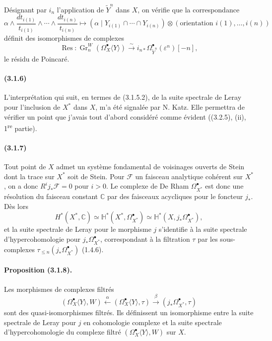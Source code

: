\documentclass[10pt]{article}
\newcommand{\C}{\mathbb C}
\newcommand{\Gr}{\operatorname{Gr}}
\newcommand{\fg}{\guillemotright}
\newcommand{\og}{\guillemotleft}
\newcommand{\iso}{\xrightarrow{\sim}}
\newcommand{\Res}{\operatorname{Res}}
\begin{document}
Désignant par $i_n$ l'application de $\widetilde Y^n$ dans $X$, on vérifie que la correspondance
\[
\alpha\wedge\frac{dt_{i(1)}}{t_{i(1)}}\wedge\cdots\wedge
\frac{dt_{i(n)}}{t_{i(n)}}
\longmapsto
(\alpha\mid Y_{i(1)}\cap\cdots\cap Y_{i(n)})\otimes
(\text{orientation }i(1),\ldots,i(n))
\]
définit des isomorphismes de complexes
\[
\tag{3.1.5.2}
\Res:\Gr_n^W(\Omega_X^\bullet\langle Y\rangle)\iso
i_{n*}\Omega_{\widetilde Y^n}^\bullet(\varepsilon^n)[-n],
\]
le \og résidu de Poincaré\fg.

\paragraph{(3.1.6)} L'interprétation qui suit, en termes de (3.1.5.2), de la suite spectrale de Leray pour l'inclusion de $X^*$ dans $X$, m'a été signalée par N. Katz. Elle permettra de vérifier un point que j'avais tout d'abord considéré comme évident ((3.2.5), (ii), 1\textsuperscript{re} partie).

\paragraph{(3.1.7)} Tout point de $X$ admet un système fondamental de voisinages ouverts de Stein dont la trace sur $X^*$ soit de Stein. Pour $\mathcal F$ un faisceau analytique cohérent sur $X^*$, on a donc $R^ij_*\mathcal F=0$ pour $i>0$. Le complexe de De Rham $\Omega_{X^*}^\bullet$ est donc une résolution du faisceau constant $\C$ par des faisceaux acycliques pour le foncteur $j_*$. Dès lors
\[
\tag{3.1.7.1}
H^*(X^*,\C)\simeq\mathbb H^*(X^*,\Omega_{X^*}^\bullet)
\simeq\mathbb H^*(X,j_*\Omega_{X^*}^\bullet),
\]
et la suite spectrale de Leray pour le morphisme $j$ s'identifie à la suite spectrale d'hypercohomologie pour $j_*\Omega_{X^*}^\bullet$, correspondant à la filtration $\tau$ par les sous-complexes $\tau_{\le n}(j_*\Omega_{X^*}^\bullet)$ (1.4.6).

\paragraph{Proposition (3.1.8).} Les morphismes de complexes filtrés
\[
(\Omega_X^\bullet\langle Y\rangle,W)
\xleftarrow{\ \alpha\ }
(\Omega_X^\bullet\langle Y\rangle,\tau)
\xrightarrow{\ \beta\ }
(j_*\Omega_{X^*}^\bullet,\tau)
\]
sont des quasi-isomorphismes filtrés. Ils définissent un isomorphisme entre la suite spectrale de Leray pour $j$ en cohomologie complexe et la suite spectrale d'hypercohomologie du complexe filtré $(\Omega_X^\bullet\langle Y\rangle,W)$ sur $X$.
\end{document}
